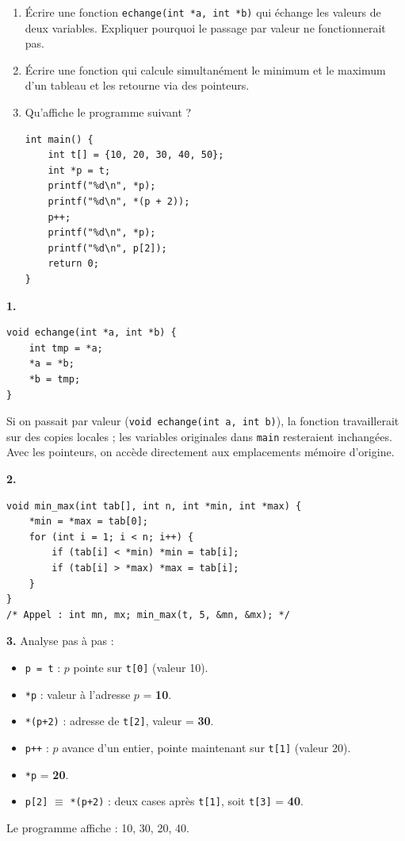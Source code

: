 \documentclass[12pt,a4paper]{article}
\begin{document}
\begin{boiteexercice}
\begin{enumerate}
  \item Écrire une fonction \texttt{echange(int *a, int *b)} qui échange les valeurs de deux variables. Expliquer pourquoi le passage par valeur ne fonctionnerait pas.
  \item Écrire une fonction qui calcule simultanément le minimum et le maximum d'un tableau et les retourne via des pointeurs.
  \item Qu'affiche le programme suivant ?
\begin{lstlisting}
int main() {
    int t[] = {10, 20, 30, 40, 50};
    int *p = t;
    printf("%d\n", *p);
    printf("%d\n", *(p + 2));
    p++;
    printf("%d\n", *p);
    printf("%d\n", p[2]);
    return 0;
}
\end{lstlisting}
\end{enumerate}
\end{boiteexercice}

\begin{boitecorrige}
\textbf{1.}
\begin{lstlisting}
void echange(int *a, int *b) {
    int tmp = *a;
    *a = *b;
    *b = tmp;
}
\end{lstlisting}
Si on passait par valeur (\texttt{void echange(int a, int b)}), la fonction travaillerait sur des copies locales ; les variables originales dans \texttt{main} resteraient inchangées. Avec les pointeurs, on accède directement aux emplacements mémoire d'origine.

\textbf{2.}
\begin{lstlisting}
void min_max(int tab[], int n, int *min, int *max) {
    *min = *max = tab[0];
    for (int i = 1; i < n; i++) {
        if (tab[i] < *min) *min = tab[i];
        if (tab[i] > *max) *max = tab[i];
    }
}
/* Appel : int mn, mx; min_max(t, 5, &mn, &mx); */
\end{lstlisting}

\textbf{3.} Analyse pas à pas :
\begin{itemize}[nosep]
  \item \texttt{p = t} : $p$ pointe sur \texttt{t[0]} (valeur 10).
  \item \texttt{*p} : valeur à l'adresse $p$ = \textbf{10}.
  \item \texttt{*(p+2)} : adresse de \texttt{t[2]}, valeur = \textbf{30}.
  \item \texttt{p++} : $p$ avance d'un entier, pointe maintenant sur \texttt{t[1]} (valeur 20).
  \item \texttt{*p} = \textbf{20}.
  \item \texttt{p[2]} $\equiv$ \texttt{*(p+2)} : deux cases après \texttt{t[1]}, soit \texttt{t[3]} = \textbf{40}.
\end{itemize}
Le programme affiche : 10, 30, 20, 40.
\end{boitecorrige}
\end{document}
